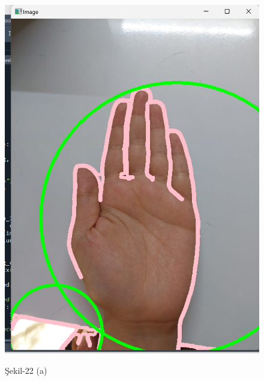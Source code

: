 \documentclass[11pt,a4paper]{report}
\begin{document}
	\begin{figure}[!h]
		\centering
		\begin{minipage}{0.45\textwidth} %
			\centering
			\includegraphics[width=\linewidth]{hatalı-el}
			\label{boyutbulma1}
			\caption*{Şekil-22 (a)}
		\end{minipage}%
		\hfill %
		\begin{minipage}{0.45\textwidth} %
			\centering

\end{minipage}
\end{figure}
\end{document}
